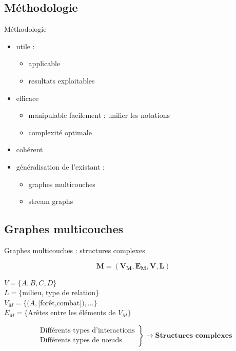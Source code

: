 \documentclass[15pt]{beamer}
\def \stgs {stream graphs}
\begin{document}
\subsection{Méthodologie}
\begin{frame}{Méthodologie}
	\begin{itemize}
		\item utile : \begin{itemize}
							\item applicable
							\item resultats exploitables
						\end{itemize}		 \pause
		\item efficace \begin{itemize}
							\item manipulable \og facilement \fg{} : unifier les notations
							\item complexité optimale
						\end{itemize}\pause
		\item cohérent \pause
		\item généralisation de l'existant : 
			\begin{itemize}
				\item graphes multicouches
				\item \stgs{}
			\end{itemize}
	\end{itemize}
\end{frame}

\subsection{Graphes multicouches}
\begin{frame}{Graphes multicouches : structures complexes}

\begin{minipage}{0.4\textwidth}
	$$\mathbf{M=(V_M,E_M,V,L)}$$
\begin{footnotesize}
$V = \{A,B,C,D\}$\\
$L = \{$milieu, type de relation$\}$\\
$V_M = \{(A,[$forêt,combat$]), \dots \}$\\
$E_M = \{$Arêtes entre les éléments de $V_M \}$
\end{footnotesize}
\end{minipage}
\begin{minipage}[r]{0.59\textwidth}
\begin{figure}
    \flushright
    
\end{figure}
\end{minipage}
$$
\left.
\begin{array}{l}
    \text{ Différents types d'interactions}\\
    \text{ Différents types de n\oe{}uds}
\end{array}
\right \}\rightarrow \textbf{Structures complexes}
$$

\end{frame}
\end{document}
